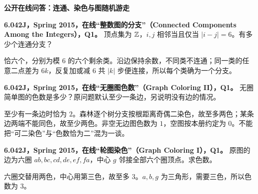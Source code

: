 \par\addvspace{7pt}\noindent\textbf{公开在线问答：连通、染色与图随机游走}\par
\begin{exercise}\label{mit:6042-online-connected-components-among-the-integers-q1}
\textbf{6.042J，Spring 2015，在线“整数图的分支”（Connected Components Among the Integers），Q1。}
顶点集为 $\mathbb Z$，$i,j$ 相邻当且仅当 $|i-j|=6$。有多少个连通分支？
\end{exercise}
\begin{solution}
恰六个，分别为模 $6$ 的六个剩余类。沿边保持余数，不同类不连通；同一类的任意二点差为 $6k$，反复加或减 $6$ 共 $|k|$ 步便连接，所以每个类确为一个分支。
\end{solution}

\begin{exercise}\label{mit:6042-online-graph-coloring-ii-q1}
\textbf{6.042J，Spring 2015，在线“无圈图色数”（Graph Coloring II），Q1。}
无圈简单图的色数是多少？原问题默认至少一条边，另说明没有边的情况。
\end{exercise}
\begin{solution}
至少有一条边时恰为 $2$。森林逐个树分支按根距离奇偶二染色，故至多两色；某条边两端不能同色，故至少两色。非空无边图色数为 $1$，空图按本册约定为 $0$。不能把“可二染色”与“色数恰为二”混为一谈。
\end{solution}

\begin{exercise}\label{mit:6042-online-graph-coloring-i-q1}
\textbf{6.042J，Spring 2015，在线“轮图染色”（Graph Coloring I），Q1。}
原图的边为六圈 $ab,bc,cd,de,ef,fa$，中心 $g$ 邻接全部六个圈顶点。求色数。
\end{exercise}
\begin{solution}
六圈交替用两色，中心用第三色，故至多 $3$。$a,b,g$ 为三角形，需要三色，所以色数为 $3$。
\end{solution}

